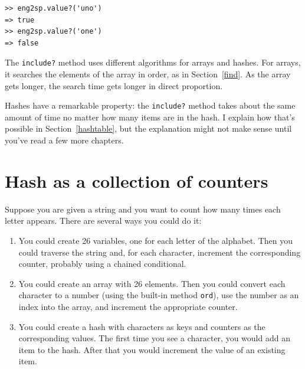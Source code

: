 \documentclass[10pt]{book}
\begin{document}
\begin{verbatim}
>> eng2sp.value?('uno')
=> true
>> eng2sp.value?('one')
=> false
\end{verbatim}
%
The {\tt include?} method uses different algorithms for arrays and
hashes.  For arrays, it searches the elements of the array in
order, as in Section~\ref{find}.  As the array gets longer, the search
time gets longer in direct proportion.

Hashes have a remarkable property: the
{\tt include?} method takes about the same amount of time no matter how
many items are in the hash.  I explain how that's possible
in Section~\ref{hashtable}, but the explanation might not make
sense until you've read a few more chapters.


\section{Hash as a collection of counters}
\label{histogram}

Suppose you are given a string and you want to count how many
times each letter appears.  There are several ways you could do it:

\begin{enumerate}

\item You could create 26 variables, one for each letter of the
alphabet.  Then you could traverse the string and, for each
character, increment the corresponding counter, probably using
a chained conditional.

\item You could create an array with 26 elements.  Then you could
convert each character to a number (using the built-in method
{\tt ord}), use the number as an index into the array, and increment
the appropriate counter.

\item You could create a hash with characters as keys
and counters as the corresponding values.  The first time you
see a character, you would add an item to the hash.  After
that you would increment the value of an existing item.

\end{enumerate}
\end{document}
